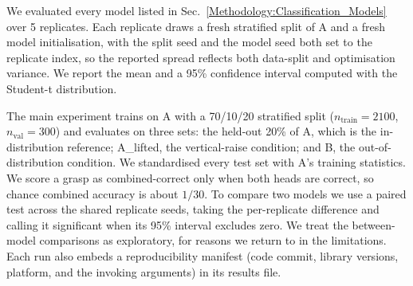 \documentclass[journal]{IEEEtran}
\begin{document}
We evaluated every model listed in Sec.~\ref{Methodology:Classification_Models} over 5 replicates. Each replicate draws a fresh stratified split of A and a fresh model initialisation, with the split seed and the model seed both set to the replicate index, so the reported spread reflects both data-split and optimisation variance. We report the mean and a 95\% confidence interval computed with the Student-t distribution.

The main experiment trains on A with a 70/10/20 stratified split ($n_\mathrm{train} = 2100$, $n_\mathrm{val} = 300$) and evaluates on three sets: the held-out 20\% of A, which is the in-distribution reference; A\_lifted, the vertical-raise condition; and B, the out-of-distribution condition. We standardised every test set with A's training statistics. We score a grasp as combined-correct only when both heads are correct, so chance combined accuracy is about $1/30$. To compare two models we use a paired test across the shared replicate seeds, taking the per-replicate difference and calling it significant when its 95\% interval excludes zero. We treat the between-model comparisons as exploratory, for reasons we return to in the limitations. Each run also embeds a reproducibility manifest (code commit, library versions, platform, and the invoking arguments) in its results file.
\end{document}
